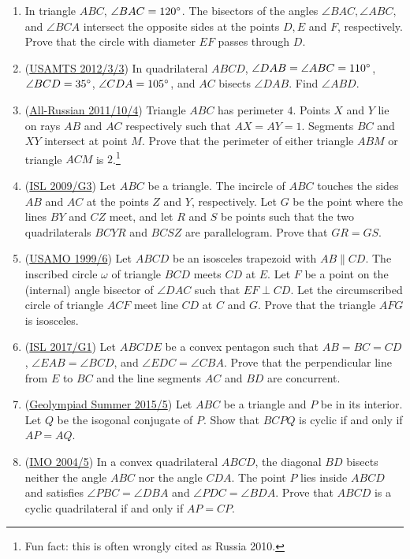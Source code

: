 \documentclass[11pt,paper=letter]{scrartcl}
\begin{document}
\begin{enumerate}
  \item In triangle $ABC$, $\angle BAC = 120^\circ$. The bisectors of the angles $\angle BAC, \angle ABC,$ and $\angle BCA$ intersect the opposite sides at the points $D, E$ and $F$, respectively. Prove that the circle with diameter $EF$ passes through $D$.

  \item (\href{https://aops.com/community/c123h515745}{USAMTS 2012/3/3}) In quadrilateral $ABCD$, $\angle DAB = \angle ABC = 110^\circ$, $\angle BCD = 35^\circ$, $\angle CDA = 105^\circ$, and $AC$ bisects $\angle DAB$. Find $\angle ABD$.

  \item (\href{https://aops.com/community/c6h404325}{All-Russian 2011/10/4}) Triangle $ABC$ has perimeter $4$. Points $X$ and $Y$ lie on rays $AB$ and $AC$ respectively such that $AX = AY = 1$. Segments $BC$ and $XY$ intersect at point $M$. Prove that the perimeter of either triangle $ABM$ or triangle $ACM$ is $2$.\footnote{Fun fact: this is often wrongly cited as Russia 2010.}

  \item (\href{https://aops.com/community/c6h355790}{ISL 2009/G3}) Let $ABC$ be a triangle. The incircle of $ABC$ touches the sides $AB$ and $AC$ at the points $Z$ and $Y$, respectively. Let $G$ be the point where the lines $BY$ and $CZ$ meet, and let $R$ and $S$ be points such that the two quadrilaterals $BCYR$ and $BCSZ$ are parallelogram. Prove that $GR=GS$.

  \item (\href{https://aops.com/community/c6h54506}{USAMO 1999/6}) Let $ABCD$ be an isosceles trapezoid with $AB \parallel CD$. The inscribed circle $\omega$ of triangle $BCD$ meets $CD$ at $E$. Let $F$ be a point on the (internal) angle bisector of $\angle DAC$ such that $EF \perp CD$. Let the circumscribed circle of triangle $ACF$ meet line $CD$ at $C$ and $G$. Prove that the triangle $AFG$ is isosceles. 

  \item (\href{https://aops.com/community/c6h1671264}{ISL 2017/G1}) Let $ABCDE$ be a convex pentagon such that $AB=BC=CD$, $\angle{EAB}=\angle{BCD}$, and $\angle{EDC}=\angle{CBA}$. Prove that the perpendicular line from $E$ to $BC$ and the line segments $AC$ and $BD$ are concurrent. 

  \item (\href{https://aops.com/community/c7419h1138166}{Geolympiad Summer 2015/5}) Let $ABC$ be a triangle and $P$ be in its interior. Let $Q$ be the isogonal conjugate of $P$. Show that $BCPQ$ is cyclic if and only if $AP=AQ$. 

  \item (\href{https://aops.com/community/c6h14092}{IMO 2004/5}) In a convex quadrilateral $ABCD$, the diagonal $BD$ bisects neither the angle $ABC$ nor the angle $CDA$. The point $P$ lies inside $ABCD$ and satisfies $\angle PBC=\angle DBA$ and $\angle PDC=\angle BDA$. Prove that $ABCD$ is a cyclic quadrilateral if and only if $AP=CP$.
\end{enumerate}
\end{document}
